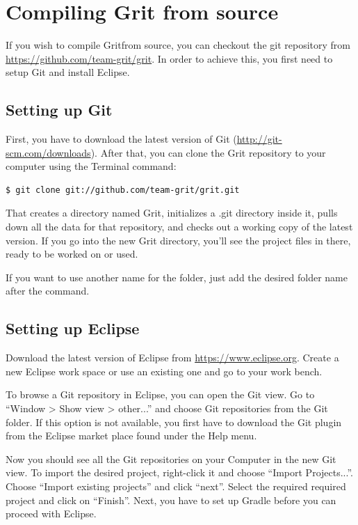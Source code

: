 \documentclass[10pt,a4paper, titlepage, toc=idx]{scrreprt}
\theoremstyle{definition}
\theoremstyle{plain}
\newcommand*{\product}{Grit}
\begin{document}
       \chapter{Compiling \product{} from source}
       If you wish to compile \product from source, you can checkout
       the git repository from
       \url{https://github.com/team-grit/grit}. In order to achieve
       this, you first need to setup Git and install Eclipse.

       \section{Setting up Git}

       First, you have to download the latest version of Git
       (\url{http://git-scm.com/downloads}). After that, you can clone
       the \product{} repository to your computer using the Terminal
       command:

\begin{lstlisting}
$ git clone git://github.com/team-grit/grit.git
\end{lstlisting}

       That creates a directory named \product, initializes a .git
       directory inside it, pulls down all the data for that
       repository, and checks out a working copy of the latest
       version. If you go into the new \product{} directory, you’ll see
       the project files in there, ready to be worked on or used.

       If you want to use another name for the folder, just add the
       desired folder name after the command.

       \section{Setting up Eclipse}

       Download the latest version of Eclipse from
       \url{https://www.eclipse.org}. Create a new Eclipse work space
       or use an existing one and go to your work bench.

       To browse a Git repository in Eclipse, you can open the Git
       view. Go to ``Window > Show view > other...'' and choose Git
       repositories from the Git folder. If this option is not
       available, you first have to download the Git plugin from the
       Eclipse market place found under the Help menu.

       Now you should see all the Git repositories on your Computer in
       the new Git view. To import the desired project, right-click it
       and choose ``Import Projects...''. Choose ``Import existing
       projects'' and click ``next''. Select the required required
       project and click on ``Finish''. Next, you have to set up
       Gradle before you can proceed with Eclipse.
\end{document}

